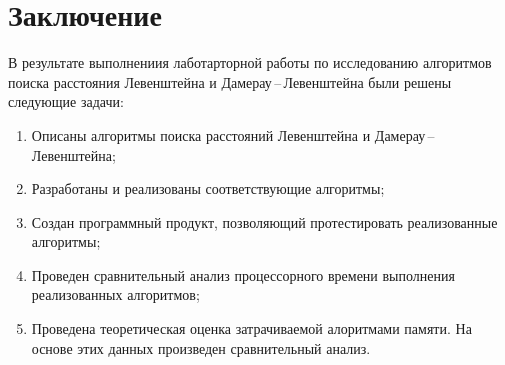 \chapter*{Заключение}

В результате выполнениия лаботарторной работы по исследованию алгоритмов поиска расстояния Левенштейна и Дамерау\,--\,Левенштейна были решены следующие задачи:
\begin{enumerate}
    \item Описаны алгоритмы поиска расстояний Левенштейна и Дамерау\,--\,Левенштейна;
    \item Разработаны и реализованы соответствующие алгоритмы;
    \item Создан программный продукт, позволяющий протестировать реали\-зованные алгоритмы;
    \item Проведен сравнительный анализ процессорного времени выполнения реализованных алгоритмов;
    \item Проведена теоретическая оценка затрачиваемой алоритмами памяти. На основе этих данных произведен сравнительный анализ.
\end{enumerate}
